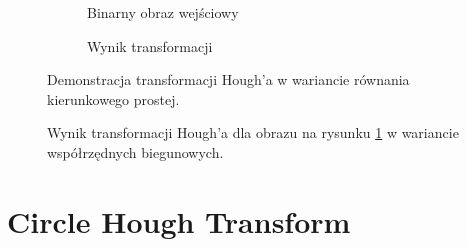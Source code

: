%     

\begin{figure}
    \centering
    \begin{subfigure}{0.4\textwidth}
        \centering
        
    \caption{Binarny obraz wejściowy}\label{fig:houghSlopeA}
    \end{subfigure}
    \begin{subfigure}{0.4\textwidth}
        \centering
        
    \caption{Wynik transformacji}\label{fig:houghSlopeB}
    \end{subfigure}

    \caption{Demonstracja transformacji Hough'a w wariancie równania kierunkowego prostej.}
\end{figure}

\begin{figure}
    \centering
    
    \caption{Wynik transformacji Hough'a dla obrazu na rysunku \ref{fig:houghSlopeA} w wariancie współrzędnych biegunowych.}
    \label{fig:houghSinCos}
\end{figure}

\section{Circle Hough Transform}

